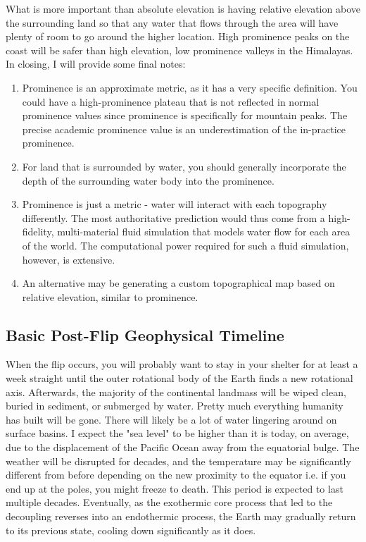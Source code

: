 \documentclass[10pt,twocolumn,letterpaper]{article}
\begin{document}
What is more important than absolute elevation is having relative elevation above the surrounding land so that any water that flows through the area will have plenty of room to go around the higher location. High prominence peaks on the coast will be safer than high elevation, low prominence valleys in the Himalayas. In closing, I will provide some final notes:

\begin{flushleft}
\begin{enumerate}
    \item Prominence is an approximate metric, as it has a very specific definition. You could have a high-prominence plateau that is not reflected in normal prominence values since prominence is specifically for mountain peaks. The precise academic prominence value is an underestimation of the in-practice prominence.
    \item For land that is surrounded by water, you should generally incorporate the depth of the surrounding water body into the prominence.
    \item Prominence is just a metric - water will interact with each topography differently. The most authoritative prediction would thus come from a high-fidelity, multi-material fluid simulation that models water flow for each area of the world. The computational power required for such a fluid simulation, however, is extensive.
    \item An alternative may be generating a custom topographical map based on relative elevation, similar to prominence.
\end{enumerate}
\end{flushleft}

\subsection{Basic Post-Flip Geophysical Timeline}

When the flip occurs, you will probably want to stay in your shelter for at least a week straight until the outer rotational body of the Earth finds a new rotational axis. Afterwards, the majority of the continental landmass will be wiped clean, buried in sediment, or submerged by water. Pretty much everything humanity has built will be gone. There will likely be a lot of water lingering around on surface basins. I expect the "sea level" to be higher than it is today, on average, due to the displacement of the Pacific Ocean away from the equatorial bulge. The weather will be disrupted for decades, and the temperature may be significantly different from before depending on the new proximity to the equator i.e. if you end up at the poles, you might freeze to death. This period is expected to last multiple decades. Eventually, as the exothermic core process that led to the decoupling reverses into an endothermic process, the Earth may gradually return to its previous state, cooling down significantly as it does.
\end{document}
